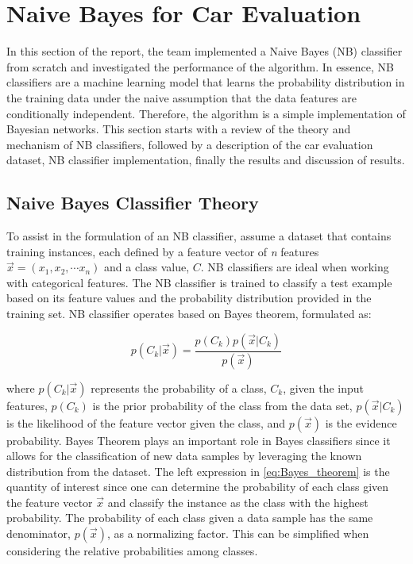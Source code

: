 \documentclass[a4paper]{article}
\begin{document}
\section{Naive Bayes for Car Evaluation}\label{naive}
In this section of the report, the team implemented a Naive Bayes (NB) classifier from scratch and investigated the performance of the algorithm. In essence, NB classifiers are a machine learning model that learns the probability distribution in the training data under the naive assumption that the data features are conditionally independent. Therefore, the algorithm is a simple implementation of Bayesian networks. This section starts with a review of the theory and mechanism of NB classifiers, followed by a description of the car evaluation dataset, NB classifier implementation, finally the results and discussion of results.

\subsection{Naive Bayes Classifier Theory}

To assist in the formulation of an NB classifier, assume a dataset that contains training instances, each defined by a feature vector of \textit{n} features $\vec{x}=(x_1, x_2, \cdots x_n)$ and a class value, $C$. NB classifiers are ideal when working with categorical features. The NB classifier is trained to classify a test example based on its feature values and the probability distribution provided in the training set. NB classifier operates based on Bayes theorem, formulated as:

\begin{equation} \label{eq:Bayes_theorem}
    p(C_k|\vec{x}) = \frac{p(C_k)p(\vec{x}|C_k)}{p(\vec{x})}
\end{equation}

where $p(C_k|\vec x)$ represents the probability of a class, $C_k$, given the input features, $p(C_k)$ is the prior probability of the class from the data set, $p(\vec x|C_k)$ is the likelihood of the feature vector given the class, and $p(\vec x)$ is the evidence probability. Bayes Theorem plays an important role in Bayes classifiers since it allows for the classification of new data samples by leveraging the known distribution from the dataset. The left expression in \cref{eq:Bayes_theorem} is the quantity of interest since one can determine the probability of each class given the feature vector $\vec {x}$ and classify the instance as the class with the highest probability. The probability of each class given a data sample has the same denominator, $p(\vec x)$, as a normalizing factor. This can be simplified when considering the relative probabilities among classes.
\end{document}
